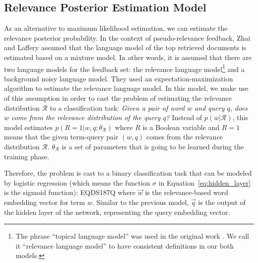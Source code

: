 \documentclass[sigconf]{acmart}
\begin{document}
\subsection{Relevance Posterior Estimation Model}
\label{sec:model2}
As an alternative to maximum likelihood estimation, we can estimate the relevance posterior probability. In the context of pseudo-relevance feedback, Zhai and Laffery \cite{Zhai:2001} assumed that the language model of the top retrieved documents is estimated based on a mixture model. In other words, it is assumed that there are two language models for the feedback set: the relevance language model\footnote{The phrase ``topical language model'' was used in the original work \cite{Zhai:2001}. We call it ``relevance language model'' to have consistent definitions in our both models.} and a background noisy language model. They used an expectation-maximization algorithm to estimate the relevance language model. In this model, we make use of this assumption in order to cast the problem of estimating the relevance distribution $\mathcal{R}$ to a classification task: \textit{Given a pair of word $w$ and query $q$, does $w$ come from the relevance distribution of the query $q$?} Instead of $p(w|\mathcal{R})$, this model estimates $p(R=1 | w, q; \theta_\mathcal{R})$ where $R$ is a Boolean variable and $R=1$ means that the given term-query pair $(w, q)$ comes from the relevance distribution $\mathcal{R}$. $\theta_\mathcal{R}$ is a set of parameters that is going to be learned during the training phase.

Therefore, the problem is cast to a binary classification task that can be modeled by logistic regression (which means the function $\sigma$ in {Equation}~\eqref{eq:hidden_layer} is the sigmoid function):
EQDS187Q
where $\vec{w}$ is the relevance-based word embedding vector for term $w$. Similar to the previous model, $\vec{q}$ is the output of the hidden layer of the network, representing the query embedding vector.
\end{document}
